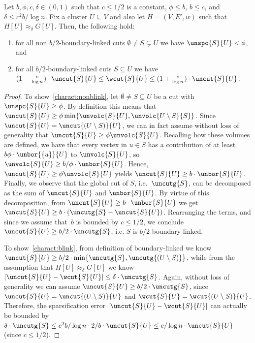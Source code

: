 \begin{lemma}
	\label{lem:blinkcuts}
	Let $b, \phi, c,\delta \in (0,1)$ such that $c \leq 1/2$ is a constant, $\phi \le b$, $b \le c$, and $\delta \le c^2b/ \log n$.  Fix a cluster $U \subseteq V$ and also let $H=(V,E',w)$ such that $H[U] \approx_\delta G[U]$. Then, the following hold:
	\begin{enumerate}
		\item \label{charact:nonblink} for all non $b/2$-boundary-linked cuts $\emptyset \neq S \subsetneq U$ we have $\unspc{S}{U} < \phi$, and
		\item \label{charact:blink} for all $b/2$-boundary-linked cuts $S \subseteq U$ we have $(1-\frac{c}{\log n})\cdot \uncut{S}{U} \le \wcut{S}{U} \le 	(1+\frac{c}{\log n})\cdot \uncut{S}{U}$.
	\end{enumerate}
\end{lemma}
\begin{proof}
	To show~\eqref{charact:nonblink}, let $\emptyset \neq S \subsetneq U$ be a cut with $\unspc{S}{U} \ge \phi$. By definition this means that $\uncut{S}{U} \ge \phi \min \{\unvolc{S}{U},\unvolc{U \setminus S}{S}\}$. Since $\uncut{S}{U}=\uncut{(U\setminus S)}{U}$, we can in fact assume without loss of generality that $\uncut{S}{U} \ge \phi \unvolc{S}{U}$. Recalling how these volumes are defined, we have that every vertex in $u \in S$ has a contribution of at least $b\phi \cdot \unbor{\{u\}}{U}$ to $\unvolc{S}{U}$, so $\unvolc{S}{U} \ge b/\phi \cdot \unbor{S}{U}$. Hence, $\uncut{S}{U} \ge \phi \unvolc{S}{U}$ yields $\uncut{S}{U} \ge b \cdot \unbor{S}{U}$. Finally, we observe that the global cut of $S$, i.e.~$\uncutg{S}$, can be decomposed as the sum of $\uncut{S}{U}$ and $\unbor{S}{U}$. By virtue of this decomposition, from $\uncut{S}{U} \ge b \cdot \unbor{S}{U}$ we get $\uncut{S}{U} \ge b \cdot (\uncutg{S}-\uncut{S}{U})$. Rearranging the terms, and since we assume that~$b$ is bounded by $c \le 1/2$, we conclude $\uncut{S}{U} \ge b/2 \cdot \uncutg{S}$, i.e. $S$ is $b/2$-boundary-linked.
	
	To show~\eqref{charact:blink}, from definition of boundary-linked we know $\uncut{S}{U} \ge b/2 \cdot \min\{\uncutg{S}, \uncutg{(U \setminus S)}\} $, while from the assumption that $H[U] \approx_\delta G[U]$ we know $|\uncut{S}{U} - \wcut{S}{U} | \le \delta \cdot \uncutg{S}$. Again, without loss of generality we can assume $\uncut{S}{U} \ge b/2 \cdot \uncutg{S}$, since $\uncut{S}{U}=\uncut{(U\setminus S)}{U}$ and $\wcut{S}{U}=\wcut{(U\setminus S)}{U}$. Therefore, the sparsification error $|\uncut{S}{U} - \wcut{S}{U} | $ can actually be bounded by $\delta \cdot \uncutg{S} \le c^2b/ \log n \cdot 2/b \cdot \uncut{S}{U} \le  c/\log n \cdot \uncut{S}{U}$ (since $c\le 1/2$).
\end{proof}

